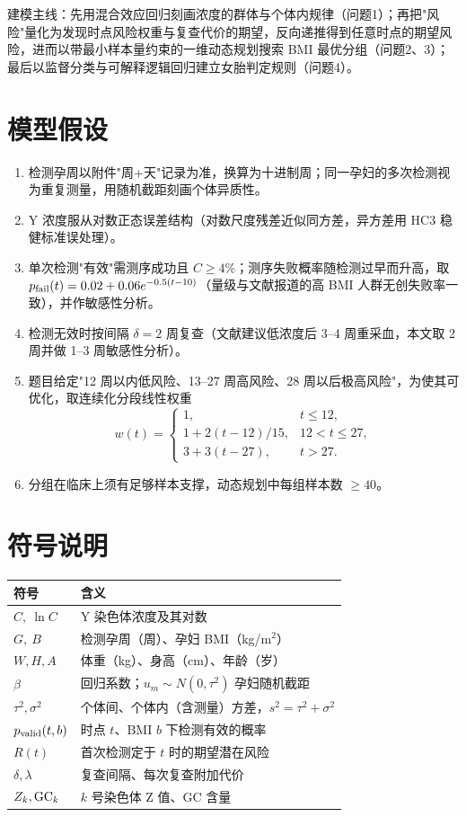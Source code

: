 \documentclass[UTF8,a4paper,11pt]{ctexart}
\begin{document}
建模主线：先用混合效应回归刻画浓度的群体与个体内规律（问题1）；再把"风险"量化为发现时点风险权重与复查代价的期望，反向递推得到任意时点的期望风险，进而以带最小样本量约束的一维动态规划搜索 BMI 最优分组（问题2、3）；最后以监督分类与可解释逻辑回归建立女胎判定规则（问题4）。

\section{模型假设}
\begin{enumerate}
\item 检测孕周以附件"周+天"记录为准，换算为十进制周；同一孕妇的多次检测视为重复测量，用随机截距刻画个体异质性。
\item Y 浓度服从对数正态误差结构（对数尺度残差近似同方差，异方差用 HC3 稳健标准误处理）。
\item 单次检测"有效"需测序成功且 $C\ge4\%$；测序失败概率随检测过早而升高，取 $p_{\rm fail}(t)=0.02+0.06e^{-0.5(t-10)}$（量级与文献报道的高 BMI 人群无创失败率一致\cite{rolnick2018,korean2023}），并作敏感性分析。
\item 检测无效时按间隔 $\delta=2$ 周复查（文献建议低浓度后 3--4 周重采血\cite{korean2023}，本文取 2 周并做 1--3 周敏感性分析）。
\item 题目给定"12 周以内低风险、13--27 周高风险、28 周以后极高风险"，为使其可优化，取连续化分段线性权重
\[
w(t)=\begin{cases}1, & t\le12,\\ 1+2(t-12)/15, & 12<t\le27,\\ 3+3(t-27), & t>27.\end{cases}
\]
\item 分组在临床上须有足够样本支撑，动态规划中每组样本数 $\ge40$。
\end{enumerate}

\section{符号说明}
\begin{table}[H]\centering\small
\begin{tabular}{ll}
\toprule
符号 & 含义\\
\midrule
$C,\ \ln C$ & Y 染色体浓度及其对数\\
$G,\ B$ & 检测孕周（周）、孕妇 BMI（kg/m$^2$）\\
$W,H,A$ & 体重（kg）、身高（cm）、年龄（岁）\\
$\beta$ & 回归系数；$u_m\sim N(0,\tau^2)$ 孕妇随机截距\\
$\tau^2,\sigma^2$ & 个体间、个体内（含测量）方差，$s^2=\tau^2+\sigma^2$\\
$p_{\rm valid}(t,b)$ & 时点 $t$、BMI $b$ 下检测有效的概率\\
$R(t)$ & 首次检测定于 $t$ 时的期望潜在风险\\
$\delta,\lambda$ & 复查间隔、每次复查附加代价\\
$Z_k,{\rm GC}_k$ & $k$ 号染色体 Z 值、GC 含量\\
\bottomrule
\end{tabular}
\end{table}
\end{document}
